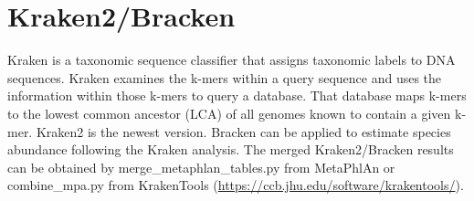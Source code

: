 \documentclass[
]{book}
\begin{document}
\section{Kraken2/Bracken}\label{kraken2bracken}

Kraken is a taxonomic sequence classifier that assigns taxonomic labels to DNA sequences.
Kraken examines the k-mers within a query sequence and uses the information within those k-mers to query a database.
That database maps k-mers to the lowest common ancestor (LCA) of all genomes known to contain a given k-mer.
Kraken2 \citep{Wood_Improved_2019} is the newest version.
Bracken \citep{Lu_Bracken_2017} can be applied to estimate species abundance following the Kraken analysis.
The merged Kraken2/Bracken results can be obtained by merge\_metaphlan\_tables.py from MetaPhlAn or combine\_mpa.py from KrakenTools (\url{https://ccb.jhu.edu/software/krakentools/}).
\end{document}

